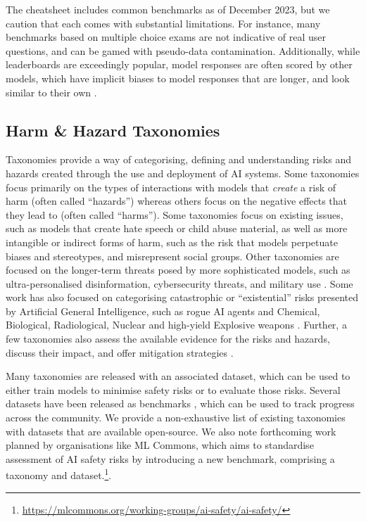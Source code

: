 The cheatsheet includes common benchmarks as of December 2023, but we caution that each comes with substantial limitations.
For instance, many benchmarks based on multiple choice exams are not indicative of real user questions, and can be gamed with pseudo-data contamination.
Additionally, while leaderboards are exceedingly popular, model responses are often scored by other models, which have implicit biases to model responses that are longer, and look similar to their own \citep{dubois2023alpacafarm}.


% 
\subsection{Harm \& Hazard Taxonomies}

Taxonomies provide a way of categorising, defining and understanding risks and hazards created through the use and deployment of AI systems. Some taxonomies focus primarily on the types of interactions with models that \textit{create} a risk of harm (often called ``hazards'') whereas others focus on the negative effects that they lead to (often called ``harms''). 
Some taxonomies focus on existing issues, such as models that create hate speech or child abuse material, as well as more intangible or indirect forms of harm, such as the risk that models perpetuate biases and stereotypes, and misrepresent social groups. Other taxonomies are focused on the longer-term threats posed by more sophisticated models, such as ultra-personalised disinformation, cybersecurity threats, and military use \citep{brundage2018malicious}. Some work has also focused on categorising catastrophic or ``existential'' risks presented by Artificial General Intelligence, such as rogue AI agents and Chemical, Biological, Radiological, Nuclear and high-yield Explosive weapons \citep{carlsmith2022powerseeking, hendrycks2023overview, 10.1145/3514094.3534146}. Further, a few taxonomies also assess the available evidence for the risks and hazards, discuss their impact, and offer mitigation strategies \citep{deng2023safer, kapoor2024societal, klyman2024aups-for-fms}. 

Many taxonomies are released with an associated dataset, which can be used to either train models to minimise safety risks or to evaluate those risks. Several datasets have been released as benchmarks \citep[e.g.][]{wang2024decodingtrust}, which can be used to track progress across the community. We provide a non-exhaustive list of existing taxonomies with datasets that are available open-source. We also note forthcoming work planned by organisations like ML Commons, which aims to standardise assessment of AI safety risks by introducing a new benchmark, comprising a taxonomy and dataset.\footnote{\url{https://mlcommons.org/working-groups/ai-safety/ai-safety/}}.


